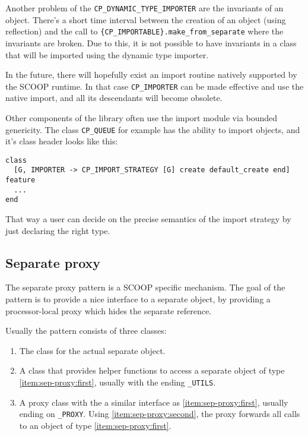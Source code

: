 \documentclass[a4paper,10pt]{report}
\begin{document}
Another problem of the \lstinline!CP_DYNAMIC_TYPE_IMPORTER! are the invariants of an object.
There's a short time interval between the creation of an object (using reflection) and the call to \lstinline!{CP_IMPORTABLE}.make_from_separate! where the invariants are broken.
Due to this, it is not possible to have invariants in a class that will be imported using the dynamic type importer.

In the future, there will hopefully exist an import routine natively supported by the SCOOP runtime.
In that case \lstinline!CP_IMPORTER! can be made effective and use the native import, and all its descendants will become obsolete.


Other components of the library often use the import module via bounded genericity.
The class \lstinline!CP_QUEUE! for example has the ability to import objects, and it's class header looks like this:
\begin{lstlisting}
class
  [G, IMPORTER -> CP_IMPORT_STRATEGY [G] create default_create end]
feature
  ...
end
\end{lstlisting}
That way a user can decide on the precise semantics of the import strategy by just declaring the right type.

\subsection{Separate proxy}

The separate proxy pattern is a SCOOP specific mechanism.
The goal of the pattern is to provide a nice interface to a separate object, by providing a processor-local proxy which hides the separate reference.

Usually the pattern consists of three classes:
\begin{enumerate} [label=(\arabic*)]
 \item\label{item:sep-proxy:first} The class for the actual separate object.
 \item\label{item:sep-proxy:second} A class that provides helper functions to access a separate object of type \ref{item:sep-proxy:first}, usually with the ending \lstinline!_UTILS!.
 \item\label{item:sep-proxy:third} A proxy class with the a similar interface as \ref{item:sep-proxy:first}, usually ending on \lstinline!_PROXY!.
 Using \ref{item:sep-proxy:second}, the proxy forwards all calls to an object of type \ref{item:sep-proxy:first}.
\end{enumerate}
\end{document}
